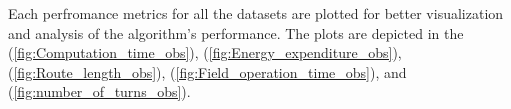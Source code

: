 



Each perfromance metrics for all the datasets are plotted for better visualization and analysis of the algorithm's performance. The plots are depicted in the (\autoref{fig:Computation_time_obs}), (\autoref{fig:Energy_expenditure_obs}), (\autoref{fig:Route_length_obs}), (\autoref{fig:Field_operation_time_obs}), and (\autoref{fig:number_of_turns_obs}).






